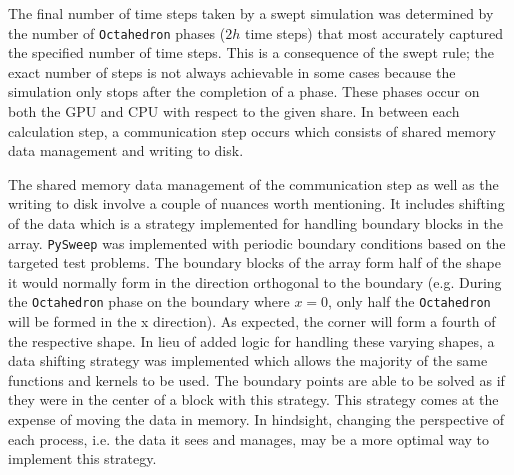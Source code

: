 \documentclass[journal,article,submit,moreauthors,pdftex]{Definitions/mdpi}
\def\pysweep{\texttt{PySweep}}
\def\Down{\texttt{Down-Pyramid}}
\def\Oct{\texttt{Octahedron}}
\def\Xb{\texttt{X-Bridge}}
\def\Yb{\texttt{Y-Bridge}}
\begin{document}
\begin{paracol}{2}
\linenumbers
\switchcolumn




\par
The final number of time steps taken by a swept simulation was determined by the number of \Oct{} phases ($2h$ time steps) that most accurately captured the specified number of time steps. This is a consequence of the swept rule; the exact number of steps is not always achievable in some cases because the simulation only stops after the completion of a phase. These phases occur on both the GPU and CPU with respect to the given share. In between each calculation step, a communication step occurs which consists of shared memory data management and writing to disk.

\par The shared memory data management of the communication step as well as the writing to disk involve a couple of nuances worth mentioning. It includes shifting of the data which is a strategy implemented for handling boundary blocks in the array. \pysweep{} was implemented with periodic boundary conditions based on the targeted test problems. The boundary blocks of the array form half of the shape it would normally form in the direction orthogonal to the boundary (e.g. During the \Oct{} phase on the boundary where $x=0$, only half the \Oct{} will be formed in the x direction). As expected, the corner will form a fourth of the respective shape. In lieu of added logic for handling these varying shapes, a data shifting strategy was implemented which allows the majority of the same functions and kernels to be used. The boundary points are able to be solved as if they were in the center of a block with this strategy. This strategy comes at the expense of moving the data in memory. In hindsight, changing the perspective of each process, i.e. the data it sees and manages, may be a more optimal way to implement this strategy.


\end{paracol}
\end{document}
